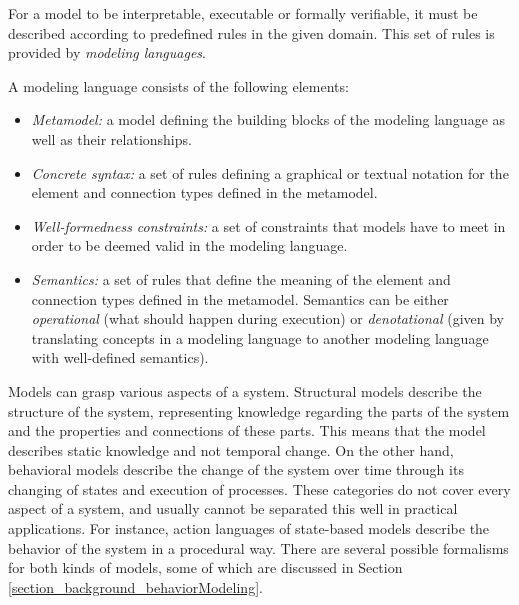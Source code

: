 For a model to be interpretable, executable or formally verifiable, it must be described according to predefined rules in the given domain. This set of rules is provided by \textit{modeling languages}.
\begin{definition}
	A modeling language consists of the following elements:
	\begin{itemize}
		\item \emph{Metamodel:} a model defining the building blocks of the modeling language as well
		as their relationships.
		\item \emph{Concrete syntax:} a set of rules defining a graphical or textual notation for the
		element and connection types defined in the metamodel.
		\item \emph{Well-formedness constraints:} a set of constraints that models have to meet in order
		to be deemed valid in the modeling language.
		\item \emph{Semantics:} a set of rules that define the meaning of the element and connection
		types defined in the metamodel. Semantics can be either \textit{operational} (what should happen during execution) or \textit{denotational} (given by translating concepts in a modeling language to another modeling language with well-defined semantics).
	\end{itemize}
\end{definition}

Models can grasp various aspects of a system. Structural models describe the structure of the system, representing knowledge regarding the parts of the system and the properties and connections of these parts. This means that the model describes static knowledge and not temporal change. On the other hand, behavioral models describe the change of the system over time through its changing of states and execution of processes. These categories do not cover every aspect of a system, and usually cannot be separated this well in practical applications. For instance, action languages of state-based models describe the behavior of the system in a procedural way. There are several possible formalisms for both kinds of models, some of which are discussed in Section \ref{section_background_behaviorModeling}.

